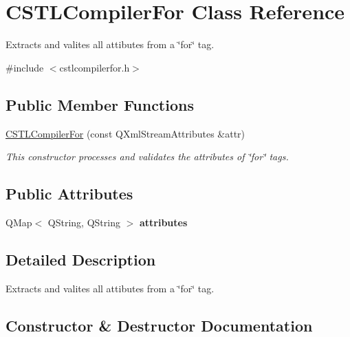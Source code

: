 \hypertarget{class_c_s_t_l_compiler_for}{}\section{C\+S\+T\+L\+Compiler\+For Class Reference}
\label{class_c_s_t_l_compiler_for}


Extracts and valites all attibutes from a \char`\"{}for\char`\"{} tag.  




{\ttfamily \#include $<$cstlcompilerfor.\+h$>$}

\subsection*{Public Member Functions}
\begin{DoxyCompactItemize}
\item 
\mbox{\hyperlink{class_c_s_t_l_compiler_for_aca7bad2177039289422199d9ea224ed9}{C\+S\+T\+L\+Compiler\+For}} (const Q\+Xml\+Stream\+Attributes \&attr)
\begin{DoxyCompactList}\small\item\em This constructor processes and validates the attributes of \char`\"{}for\char`\"{} tags. \end{DoxyCompactList}\end{DoxyCompactItemize}
\subsection*{Public Attributes}
\begin{DoxyCompactItemize}
\item 
\mbox{\label{class_c_s_t_l_compiler_for_af3fc4b37c220af702aa93ea69b99cec6}} 
Q\+Map$<$ Q\+String, Q\+String $>$ {\bfseries attributes}
\end{DoxyCompactItemize}


\subsection{Detailed Description}
Extracts and valites all attibutes from a \char`\"{}for\char`\"{} tag. 

\subsection{Constructor \& Destructor Documentation}
\mbox{\label{class_c_s_t_l_compiler_for_aca7bad2177039289422199d9ea224ed9}} 
